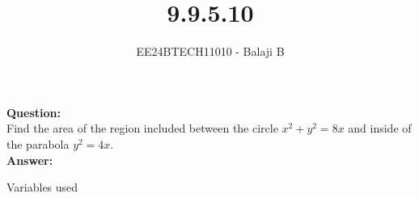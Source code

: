 \documentclass[journal]{IEEEtran}
\begin{document}

\vspace{3cm}

\title{9.9.5.10}
\author{EE24BTECH11010 - Balaji B}
{\let\newpage\relax\maketitle}
\textbf{Question:}\\
Find the area of the region included between the circle $x^2 + y^2 = 8x$ and inside of the parabola $y^2 = 4x$. \\
\textbf{Answer:}
\begin{table}[h!]
    \centering
    
    \caption{Variables used}
    \label{tab1-1.2-20}
\end{table} 
\end{document}
